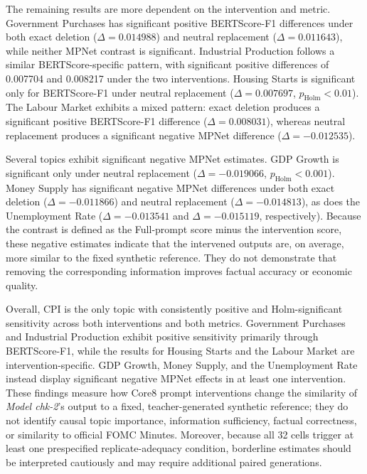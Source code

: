 The remaining results are more dependent on the intervention and metric.
Government Purchases has significant positive BERTScore-F1 differences under
both exact deletion (\(\Delta=0.014988\)) and neutral replacement
(\(\Delta=0.011643\)), while neither MPNet contrast is significant. Industrial
Production follows a similar BERTScore-specific pattern, with significant
positive differences of 0.007704 and 0.008217 under the two interventions.
Housing Starts is significant only for BERTScore-F1 under neutral replacement
(\(\Delta=0.007697\), \(p_{\mathrm{Holm}}<0.01\)). The Labour Market exhibits
a mixed pattern: exact deletion produces a significant positive
BERTScore-F1 difference (\(\Delta=0.008031\)), whereas neutral replacement
produces a significant negative MPNet difference
(\(\Delta=-0.012535\)).


Several topics exhibit significant negative MPNet estimates. GDP Growth is
significant only under neutral replacement
(\(\Delta=-0.019066\), \(p_{\mathrm{Holm}}<0.001\)). Money Supply has
significant negative MPNet differences under both exact deletion
(\(\Delta=-0.011866\)) and neutral replacement
(\(\Delta=-0.014813\)), as does the Unemployment Rate
(\(\Delta=-0.013541\) and \(\Delta=-0.015119\), respectively). Because the
contrast is defined as the Full-prompt score minus the intervention score,
these negative estimates indicate that the intervened outputs are, on average,
more similar to the fixed synthetic reference. They do not demonstrate that
removing the corresponding information improves factual accuracy or economic
quality.


Overall, CPI is the only topic with consistently positive and
Holm-significant sensitivity across both interventions and both metrics.
Government Purchases and Industrial Production exhibit positive sensitivity
primarily through BERTScore-F1, while the results for Housing Starts and the
Labour Market are intervention-specific. GDP Growth, Money Supply, and the
Unemployment Rate instead display significant negative MPNet effects in at
least one intervention. These findings measure how Core8 prompt interventions
change the similarity of \textit{Model chk-2}'s output to a fixed,
teacher-generated synthetic reference; they do not identify causal topic
importance, information sufficiency, factual correctness, or similarity to
official FOMC Minutes. Moreover, because all 32 cells trigger at least one
prespecified replicate-adequacy condition, borderline estimates should be
interpreted cautiously and may require additional paired generations.


